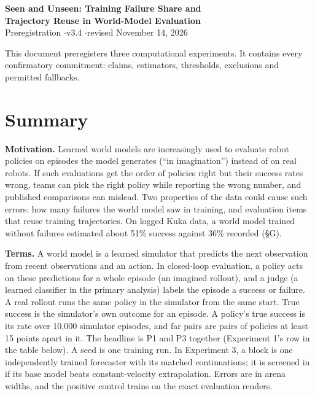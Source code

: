 \documentclass[10pt,letterpaper]{article}
\begin{document}
\begin{center}
{\Large\bfseries Seen and Unseen: Training Failure Share and\\[2pt] Trajectory Reuse in World-Model Evaluation}\\[6pt]
{\normalsize Preregistration \quad$\cdot$\quad v3.4 \quad$\cdot$\quad revised November 14, 2026}
\end{center}
\vspace{2pt}
This document preregisters three computational experiments.
It contains every confirmatory commitment: claims,
estimators, thresholds, exclusions and permitted fallbacks.

\hypertarget{summary}{%
\section{Summary}\label{summary}}

\textbf{Motivation.} Learned world models are increasingly
used to evaluate robot policies on episodes the model
generates (``in imagination'') instead of on real robots. If
such evaluations get the order of policies right but their
success rates wrong, teams can pick the right policy while
reporting the wrong number, and published comparisons can
mislead. Two properties of the data could cause such errors:
how many failures the world model saw in training, and
evaluation items that reuse training trajectories. On logged
Kuka data, a world model trained without failures estimated
about 51\% success against 36\% recorded (§G).

\textbf{Terms.} A world model is a learned simulator that
predicts the next observation from recent observations and
an action. In closed-loop evaluation, a policy acts on these
predictions for a whole episode (an imagined rollout), and a
judge (a learned classifier in the primary analysis) labels
the episode a success or failure. A real rollout runs the
same policy in the simulator from the same start. True
success is the simulator's own outcome for an episode. A
policy's true success is its rate over 10,000 simulator
episodes, and far pairs are pairs of policies at least 15
points apart in it. The headline is P1 and P3 together
(Experiment 1's row in the table below). A seed is one
training run. In Experiment 3, a block is one independently
trained forecaster with its matched continuations; it is
screened in if its base model beats constant-velocity
extrapolation. Errors are in arena widths, and the positive
control trains on the exact evaluation renders.
\end{document}
